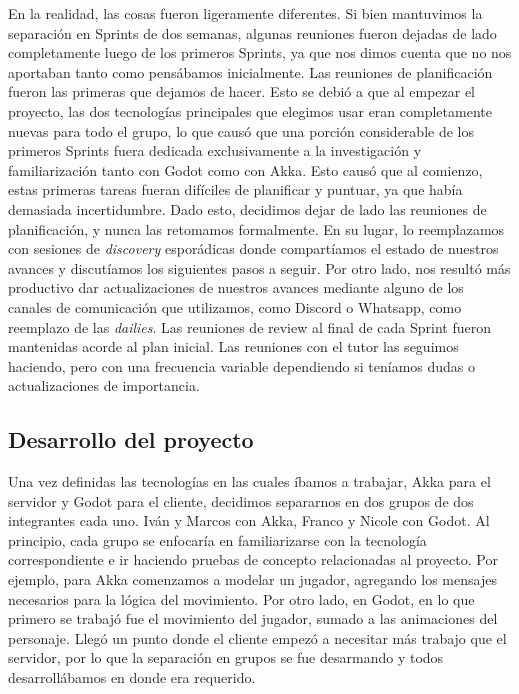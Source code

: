 En la realidad, las cosas fueron ligeramente diferentes. Si bien mantuvimos la separación en Sprints de dos semanas, algunas reuniones
fueron dejadas de lado completamente luego de los primeros Sprints, ya que nos dimos cuenta que no nos aportaban tanto como pensábamos
inicialmente.
Las reuniones de planificación fueron las primeras que dejamos de hacer. Esto se debió a que al empezar el proyecto, las 
dos tecnologías principales que elegimos usar eran completamente nuevas para todo el grupo, lo que causó que una porción considerable de
los primeros Sprints fuera dedicada exclusivamente a la investigación y familiarización tanto con Godot como con Akka. Esto causó que al
comienzo, estas primeras tareas fueran difíciles de planificar y puntuar, ya que había demasiada incertidumbre. Dado esto, decidimos dejar
de lado las reuniones de planificación, y nunca las retomamos formalmente. En su lugar, lo reemplazamos con sesiones de \textit{discovery} esporádicas donde compartíamos
el estado de nuestros avances y discutíamos los siguientes pasos a seguir.
Por otro lado, nos resultó más productivo dar actualizaciones de nuestros avances mediante alguno de los canales de comunicación que utilizamos, como Discord o Whatsapp,
como reemplazo de las \textit{dailies}.
Las reuniones de review al final de cada Sprint fueron mantenidas acorde al plan inicial.
Las reuniones con el tutor las seguimos haciendo, pero con una frecuencia variable dependiendo si teníamos dudas o actualizaciones de importancia.

\subsection{Desarrollo del proyecto}

\noindent Una vez definidas las tecnologías en las cuales íbamos a trabajar, Akka para el servidor y Godot para el cliente, decidimos separarnos
en dos grupos de dos integrantes cada uno. Iván y Marcos con Akka, Franco y Nicole con Godot. Al principio, cada grupo se enfocaría en 
familiarizarse con la tecnología correspondiente e ir haciendo pruebas de concepto relacionadas al proyecto. Por ejemplo, para Akka 
comenzamos a modelar un jugador, agregando los mensajes necesarios para la lógica del movimiento. Por otro lado, en Godot, en lo que primero
se trabajó fue el movimiento del jugador, sumado a las animaciones del personaje.
Llegó un punto donde el cliente empezó a necesitar más trabajo que el servidor, por lo que la separación en grupos se fue desarmando y
todos desarrollábamos en donde era requerido.

